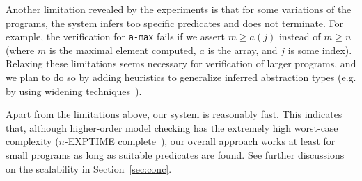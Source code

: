 Another limitation revealed by the experiments is that for some 
variations of the programs, the system infers too specific predicates 
and does not terminate. For example, the verification for \texttt{a-max} 
fails if we assert \(m\geq a(j)\) instead of \(m\geq n\) (where \(m\) is 
the maximal element computed, \(a\) is the array, and \(j\) is some 
index).
Relaxing these limitations seems necessary for verification of larger 
programs, and we plan to do so by adding heuristics to generalize 
inferred abstraction types (e.g. by using widening 
techniques~\cite{Cousot1978}).

Apart from the limitations above, our system is reasonably fast. This 
indicates that, although higher-order model checking has the extremely 
high worst-case complexity (\(n\)-EXPTIME complete~\cite{Ong2006}),
our overall approach works at least for small programs as long as 
suitable predicates are found. See further discussions on the 
scalability in Section~\ref{sec:conc}.

